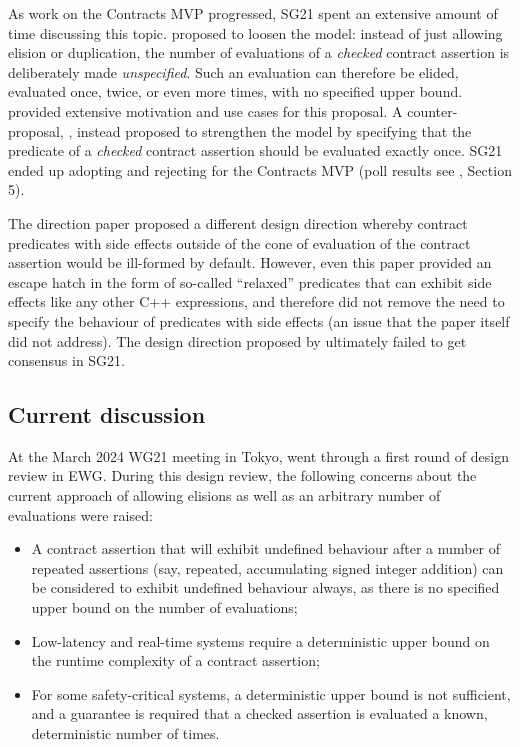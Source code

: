 As work on the Contracts MVP progressed, SG21 spent an extensive amount of time discussing this topic. \cite{P2751R1} proposed to loosen the \cite{P2521R5} model: instead of just allowing elision or duplication, the number of evaluations of a \emph{checked} contract assertion is deliberately made \emph{unspecified}. Such an evaluation can therefore be elided, evaluated once, twice, or even more times, with no specified upper bound. \cite{P2751R1} provided extensive motivation and use cases for this proposal. A counter-proposal, \cite{P2756R0}, instead proposed to strengthen the \cite{P2521R5} model by specifying that the predicate of a \emph{checked} contract assertion should be evaluated exactly once. SG21 ended up adopting  \cite{P2751R1} and rejecting \cite{P2756R0} for the Contracts MVP (poll results see \cite{P2751R1}, Section 5).

The direction paper \cite{P2680R1} proposed a different design direction whereby contract predicates with side effects outside of the cone of evaluation of the contract assertion would be ill-formed by default. However, even this paper provided an escape hatch in the form of so-called ``relaxed'' predicates that can exhibit side effects like any other C++ expressions, and therefore did not remove the need to specify the behaviour of predicates with side effects (an issue that the paper itself did not address). The design direction proposed by \cite{P2680R1} ultimately failed to get consensus in SG21.

\subsection{Current discussion}

At the March 2024 WG21 meeting in Tokyo, \cite{P2900R6}  went through a first round of design review in EWG. During this design review, the following concerns about the current approach of allowing elisions as well as an arbitrary number of evaluations were raised:
\begin{itemize}
\item A contract assertion that will exhibit undefined behaviour after a number of repeated assertions (say, repeated, accumulating signed integer addition) can be considered to exhibit undefined behaviour always, as there is no specified upper bound on the number of evaluations;
\item Low-latency and real-time systems require a deterministic upper bound on the runtime complexity of a contract assertion;
\item For some safety-critical systems, a deterministic upper bound is not sufficient, and a guarantee is required that a checked assertion is evaluated a known, deterministic number of times.
\end{itemize} 

